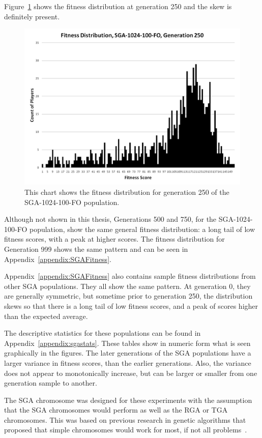 Figure~\ref{figure-sga_gen250} shows the fitness distribution at generation 250
and the skew is definitely present.

\begin{figure}[htp]
\centerline{\includegraphics[width=0.75\columnwidth]{Figures/SGA_1024_100_FO_gen250.png}}
\caption[SGA Fitness Generation 289]{This chart shows the fitness
distribution for generation 250 of the SGA-1024-100-FO population.}
\label{figure-sga_gen250}
\end{figure}

Although not shown in this thesis, Generations 500 and 750, for the
SGA-1024-100-FO population, show the same general fitness distribution: a long
tail of low fitness scores, with a peak at higher scores. The fitness
distribution for Generation 999 shows the same pattern and can be seen in
Appendix~\ref{appendix:SGAFitness}.

Appendix~\ref{appendix:SGAFitness} also contains sample fitness distributions
from other SGA populations. They all show the same pattern. At generation 0,
they are generally symmetric, but sometime prior to generation 250, the
distribution skews so that there is a long tail of low fitness scores, and a
peak of scores higher than the expected average.

The descriptive statistics for these populations can be found in
Appendix~\ref{appendix:sgastats}. These tables show in numeric form what is seen
graphically in the figures. The later generations of the SGA populations have a
larger variance in fitness scores, than the earlier generations. Also, the
variance does not appear to monotonically increase, but can be larger or smaller
from one generation sample to another.

The SGA chromosome was designed for these experiments with the assumption that
the SGA chromosomes would perform as well as the RGA or TGA chromosomes. This
was based on previous research in genetic algorithms that proposed that simple
chromosomes would work for most, if not all problems~\cite{goldberg1989genetic}.

